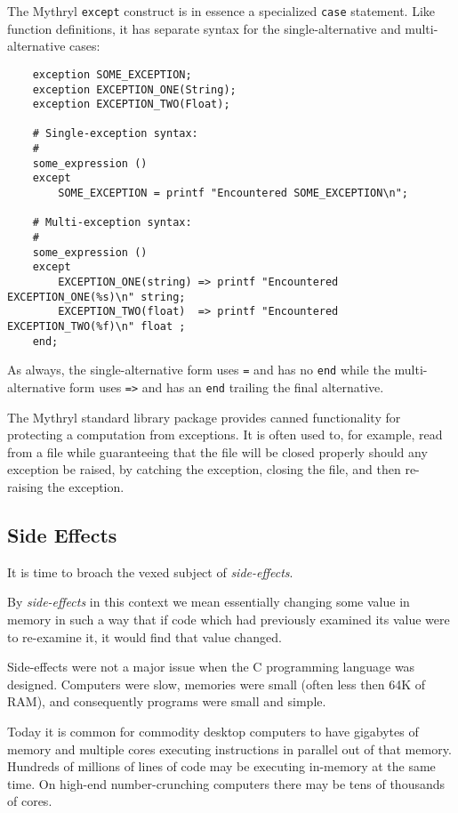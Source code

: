 The Mythryl {\tt except} construct is in essence a specialized 
{\tt case} statement.  Like function definitions, it has separate 
syntax for the single-alternative and multi-alternative cases:

\begin{verbatim}
    exception SOME_EXCEPTION; 
    exception EXCEPTION_ONE(String); 
    exception EXCEPTION_TWO(Float); 

    # Single-exception syntax:
    #
    some_expression ()
    except
        SOME_EXCEPTION = printf "Encountered SOME_EXCEPTION\n";

    # Multi-exception syntax:
    #
    some_expression ()
    except
        EXCEPTION_ONE(string) => printf "Encountered EXCEPTION_ONE(%s)\n" string;
        EXCEPTION_TWO(float)  => printf "Encountered EXCEPTION_TWO(%f)\n" float ;
    end;
\end{verbatim}

As always, the single-alternative form uses {\tt =} and has no {\tt end} while 
the multi-alternative form uses {\tt =>} and has an {\tt end} trailing the final 
alternative.
 
The Mythryl standard library  package provides 
canned functionality for protecting a computation from exceptions.  It is 
often used to, for example, read from a file while guaranteeing that the 
file will be closed properly should any exception be raised, by catching 
the exception, closing the file, and then re-raising the exception.

\cutend*

\subsection{Side Effects}

It is time to broach the vexed subject of {\it side-effects}.

By {\it side-effects} in this context we mean essentially changing  
some value in memory in such a way that if code which had previously 
examined its value were to re-examine it, it would find that value 
changed.

Side-effects were not a major issue when the C programming 
language was designed.  Computers were slow, memories were small 
(often less then 64K of RAM), and consequently programs were small 
and simple.

Today it is common for commodity desktop computers to have 
gigabytes of memory and multiple cores executing instructions 
in parallel out of that memory.  Hundreds of millions of lines 
of code may be executing in-memory at the same time.  On high-end 
number-crunching computers there may be tens of thousands of cores.

